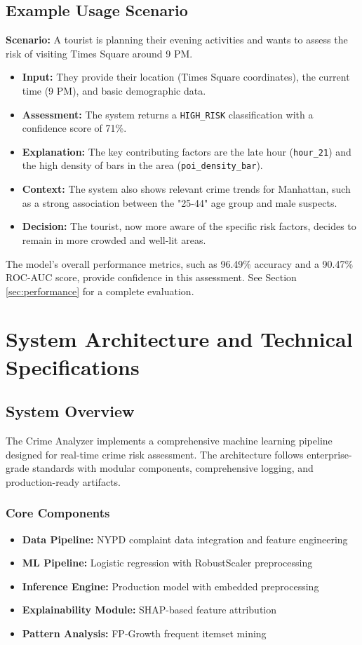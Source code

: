 \documentclass[11pt]{article}
\begin{document}
\subsection{Example Usage Scenario}
\textbf{Scenario:} A tourist is planning their evening activities and wants to assess the risk of visiting Times Square around 9 PM.
\begin{itemize}[leftmargin=*]
    \item \textbf{Input:} They provide their location (Times Square coordinates), the current time (9 PM), and basic demographic data.
    \item \textbf{Assessment:} The system returns a \texttt{HIGH\_RISK} classification with a confidence score of 71\%.
    \item \textbf{Explanation:} The key contributing factors are the late hour (\texttt{hour\_21}) and the high density of bars in the area (\texttt{poi\_density\_bar}).
    \item \textbf{Context:} The system also shows relevant crime trends for Manhattan, such as a strong association between the "25-44" age group and male suspects.
    \item \textbf{Decision:} The tourist, now more aware of the specific risk factors, decides to remain in more crowded and well-lit areas.
\end{itemize}
\noindent The model's overall performance metrics, such as 96.49\% accuracy and a 90.47\% ROC-AUC score, provide confidence in this assessment. See Section \ref{sec:performance} for a complete evaluation.

\section{System Architecture and Technical Specifications}

\subsection{System Overview}
The Crime Analyzer implements a comprehensive machine learning pipeline designed for real-time crime risk assessment. The architecture follows enterprise-grade standards with modular components, comprehensive logging, and production-ready artifacts.

\subsubsection{Core Components}
\begin{itemize}[leftmargin=*]
\item \textbf{Data Pipeline:} NYPD complaint data integration and feature engineering
\item \textbf{ML Pipeline:} Logistic regression with RobustScaler preprocessing
\item \textbf{Inference Engine:} Production model with embedded preprocessing
\item \textbf{Explainability Module:} SHAP-based feature attribution
\item \textbf{Pattern Analysis:} FP-Growth frequent itemset mining
\end{itemize}
\end{document}
